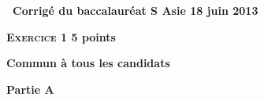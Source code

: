 \documentclass[10pt]{article}
\begin{document}
\setlength\parindent{0mm}
\renewcommand \footrulewidth{.2pt}
\pagestyle{fancy}
\thispagestyle{empty}

\begin{center}{\Large{\textbf{\decofourleft~Corrigé du baccalauréat S Asie 
18 juin 2013~\decofourright }}} \end{center}

\vspace{0,25cm}

%

\textbf{\textsc{Exercice 1} \hfill 5 points}

\textbf{Commun  à tous les candidats}

\medskip

%

\textbf{Partie A}

% 

\medskip
 
% 
%
%
 
\end{document}
